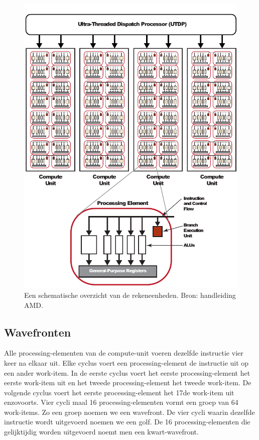 \begin{figure}[h]
\centering
\includegraphics{alu}
\caption{\label{alu}Een schematische overzicht van de rekeneenheden. Bron: handleiding AMD\cite[p.~1-5]{amd}.}
\end{figure}




\subsection{Wavefronten}
\label{wavefront}
Alle processing-elementen van de compute-unit voeren dezelfde instructie vier keer na elkaar uit. Elke cyclus voert een processing-element de instructie uit op een ander work-item. In de eerste cyclus voert het eerste processing-element het eerste work-item uit en het tweede processing-element het tweede work-item. De volgende cyclus voert het eerste processing-element het 17de work-item uit enzovoorts. Vier cycli maal 16 processing-elementen vormt een groep van 64 work-items. Zo een groep noemen we een wavefront. De vier cycli waarin dezelfde instructie wordt uitgevoerd noemen we een golf. De 16 processing-elementen die gelijktijdig worden uitgevoerd noemt men een kwart-wavefront.

